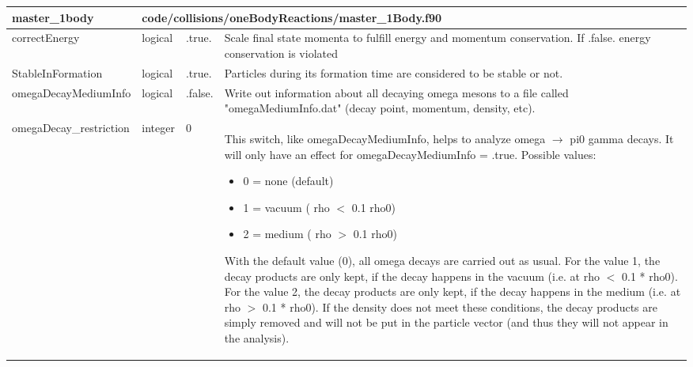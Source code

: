 \documentclass{article}
\begin{document}
\begin{longtable}{llll}
\toprule
\textbf{\large{master\_1body}} & \multicolumn{3}{l}{\footnotesize{code/collisions/oneBodyReactions/master\_1Body.f90}}\\*
\midrule
\endfirsthead
\midrule
\endhead
correctEnergy & \begin{minipage}[t]{2cm}logical\end{minipage} & \begin{minipage}[t]{2cm}.true.\end{minipage} & \begin{minipage}[t]{12cm}Scale final state momenta to fulfill energy and momentum conservation. If .false. energy conservation is violated\end{minipage}\\*
\midrule
StableInFormation & \begin{minipage}[t]{2cm}logical\end{minipage} & \begin{minipage}[t]{2cm}.true.\end{minipage} & \begin{minipage}[t]{12cm}Particles during its formation time are considered to be stable or not.\end{minipage}\\*
\midrule
omegaDecayMediumInfo & \begin{minipage}[t]{2cm}logical\end{minipage} & \begin{minipage}[t]{2cm}.false.\end{minipage} & \begin{minipage}[t]{12cm}Write out information about all decaying omega mesons to a file called "omegaMediumInfo.dat" (decay point, momentum, density, etc).\end{minipage}\\*
\midrule
omegaDecay\_restriction & \begin{minipage}[t]{2cm}integer\end{minipage} & \begin{minipage}[t]{2cm}0\end{minipage} & \begin{minipage}[t]{12cm}This switch, like omegaDecayMediumInfo, helps to analyze omega $\rightarrow$ pi0 gamma decays. It will only have an effect for omegaDecayMediumInfo = .true. Possible values:\begin{itemize}\leftmargin0em\itemindent0pt\item 0 = none (default)\item 1 = vacuum ( rho $<$ 0.1 rho0)\item 2 = medium ( rho $>$ 0.1 rho0)\end{itemize} With the default value (0), all omega decays are carried out as usual. For the value 1, the decay products are only kept, if the decay happens in the vacuum (i.e. at rho $<$ 0.1 * rho0). For the value 2, the decay products are only kept, if the decay happens in the medium (i.e. at rho $>$ 0.1 * rho0). If the density does not meet these conditions, the decay products are simply removed and will not be put in the particle vector (and thus they will not appear in the analysis).\end{minipage}\\*

\end{longtable}
\end{document}
